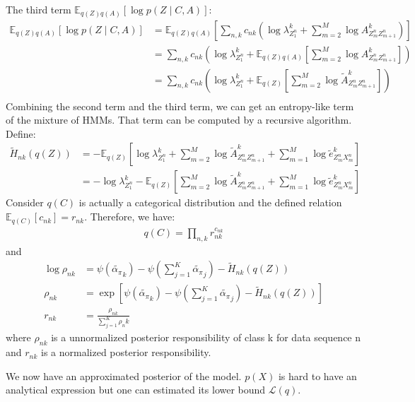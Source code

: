 \documentclass[12pt]{article}
\newenvironment{problem}[2][Problem]{\begin{trivlist}
\item[\hskip \labelsep {\bfseries #1}\hskip \labelsep {\bfseries #2.}]}{\end{trivlist}}
\begin{document}
\begin{problem}{2.8.24}
The third term $\mathbb{E}_{q(Z)q(A)}[\log p(Z \mid C, A)]$:
\begin{align*}
    \mathbb{E}_{q(Z)q(A)}[\log p(Z \mid C, A)]
    &= \mathbb{E}_{q(Z)q(A)}[
        \sum_{n,k}c_{nk}(\log\lambda^k_{Z^n_{1}} + \sum_{m=2}^{M}\log A^k_{Z^n_{m}Z^n_{m+1}})] \\
    &= \sum_{n,k}c_{nk}(\log\lambda^k_{Z^n_{1}} 
        + \mathbb{E}_{q(Z)q(A)}[\sum_{m=2}^{M}\log A^k_{Z^n_{m}Z^n_{m+1}}]) \\
    &= \sum_{n,k}c_{nk}(\log\lambda^k_{Z^n_{1}} 
        + \mathbb{E}_{q(Z)}[\sum_{m=2}^{M}\log \tilde{A}^k_{Z^n_{m}Z^n_{m+1}}]) \\
\end{align*}
Combining the second term and the third term, we can get an entropy-like term
of the mixture of HMMs. That term can be computed by a recursive algorithm.
Define:
\begin{align*}
    \tilde{H}_{nk}(q(Z)) &= -\mathbb{E}_{q(Z)}[
            \log\lambda^k_{Z^n_{1}} 
            + \sum_{m=2}^{M}\log \tilde{A}^k_{Z^n_{m}Z^n_{m+1}}
            + \sum_{m=1}^{M}\log \tilde{e}^k_{Z^n_m X^n_m}] \\
    &= - \log\lambda^k_{Z^n_{1}} -\mathbb{E}_{q(Z)}[            
            \sum_{m=2}^{M}\log \tilde{A}^k_{Z^n_{m}Z^n_{m+1}}
            + \sum_{m=1}^{M}\log \tilde{e}^k_{Z^n_m X^n_m}]
\end{align*}
Consider $q(C)$ is actually a categorical distribution and the defined relation
$\mathbb{E}_{q(C)}[c_{nk}] = r_{nk}$. Therefore, we have:
\begin{align*}
    q(C) = \prod_{n,k} r_{nk}^{c_{nk}}
\end{align*}
and 
\begin{align*}
    \log \rho_{nk} &= \psi(\tilde{\alpha_\pi}_k) - \psi(\sum_{j=1}^{K}\tilde{\alpha_\pi}_j)
                    - \tilde{H}_{nk}(q(Z)) \\
         \rho_{nk} &= \exp[\psi(\tilde{\alpha_\pi}_k) - \psi(\sum_{j=1}^{K}\tilde{\alpha_\pi}_j)
                        - \tilde{H}_{nk}(q(Z))] \\
         r_{nk} &= \frac{\rho_{nk}}{\sum_{j=1}^{K}\rho_nk}
\end{align*}
where $\rho_{nk}$ is a unnormalized posterior responsibility of class k for data sequence n and
$r_{nk}$ is a normalized posterior responsibility.

We now have an approximated posterior of the model. $p(X)$ is hard to have an analytical expression
but one can estimated its lower bound $\mathcal{L}(q)$.


\end{problem}
\end{document}
